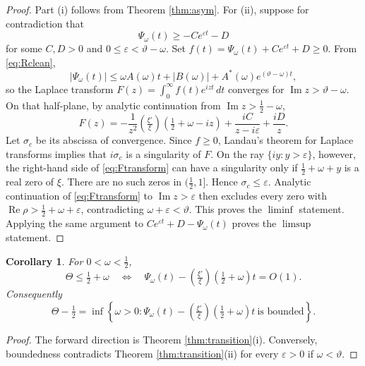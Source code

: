 \documentclass[11pt,reqno]{amsart}
\theoremstyle{plain}
\newtheorem{corollary}[theorem]{Corollary}
\theoremstyle{definition}
\newcommand{\Rp}{\operatorname{Re}}
\newcommand{\Ip}{\operatorname{Im}}
\newcommand{\lxi}[1]{\left(\tfrac{\xi'}{\xi}\right)\!#1}
\begin{document}
\begin{proof}
Part (i) follows from Theorem \ref{thm:asym}.  For (ii), suppose for contradiction that
\[
 \Psi_\omega(t)\ge-Ce^{\varepsilon t}-D
\]
for some $C,D>0$ and $0\le\varepsilon<\vartheta-\omega$.  Set
$f(t)=\Psi_\omega(t)+Ce^{\varepsilon t}+D\ge0$.  From \eqref{eq:Rclean},
\[
 |\Psi_\omega(t)|\le \omega A(\omega)t+|B(\omega)|+A^*(\omega)e^{(\vartheta-\omega)t},
\]
so the Laplace transform $F(z)=\int_0^\infty f(t)e^{izt}\,dt$ converges for
$\Ip z>\vartheta-\omega$.  On that half-plane, by analytic continuation from
$\Ip z>\tfrac12-\omega$,
\begin{equation}\label{eq:Ftransform}
 F(z)=-\frac1{z^2}\lxi{\left(\tfrac12+\omega-iz\right)}
 +\frac{iC}{z-i\varepsilon}+\frac{iD}{z}.
\end{equation}
Let $\sigma_c$ be its abscissa of convergence.  Since $f\ge0$, Landau's theorem for Laplace
transforms \cite[Ch.~II, Thm.~5b]{Widder} implies that $i\sigma_c$ is a singularity of $F$.
On the ray $\{iy:y>\varepsilon\}$, however, the right-hand side of \eqref{eq:Ftransform} can have
a singularity only if $\tfrac12+\omega+y$ is a real zero of $\xi$.  There are no such zeros in
$(\tfrac12,1]$.  Hence $\sigma_c\le\varepsilon$.  Analytic continuation of
\eqref{eq:Ftransform} to $\Ip z>\varepsilon$ then excludes every zero with
$\Rp\rho>\tfrac12+\omega+\varepsilon$, contradicting
$\omega+\varepsilon<\vartheta$.  This proves the $\liminf$ statement.  Applying the same argument
to $Ce^{\varepsilon t}+D-\Psi_\omega(t)$ proves the $\limsup$ statement.
\end{proof}

\begin{corollary}\label{cor:boundedCharacterization}
For $0<\omega<\tfrac12$,
\begin{equation}\label{eq:boundedCharacterization}
 \Theta\le\tfrac12+\omega
 \quad\Longleftrightarrow\quad
 \Psi_\omega(t)-\lxi{\left(\tfrac12+\omega\right)}t=O(1).
\end{equation}
Consequently
\[
 \Theta-\tfrac12
 =\inf\left\{\omega>0:
 \Psi_\omega(t)-\lxi{\left(\tfrac12+\omega\right)}t\ \text{is bounded}\right\}.
\]
\end{corollary}

\begin{proof}
The forward direction is Theorem \ref{thm:transition}(i).  Conversely, boundedness contradicts
Theorem \ref{thm:transition}(ii) for every $\varepsilon>0$ if $\omega<\vartheta$.
\end{proof}
\end{document}
